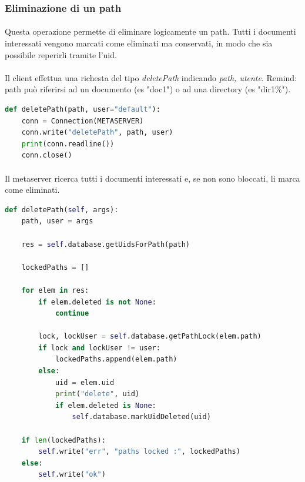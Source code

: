 \documentclass{article}
\begin{document}
\subsubsection{Eliminazione di un path}

\paragraph{} Questa operazione permette di eliminare logicamente un path. Tutti i documenti interessati vengono marcati come eliminati ma conservati, in modo che sia possibile reperirli tramite l'uid.

\paragraph{} Il client effettua una richesta del tipo \emph{deletePath} indicando \emph{path, utente}. Remind: path può riferirsi ad un documento (es "doc1") o ad una directory (es "dir1\%"). 

\begin{lstlisting}[language=Python, title=Client]
def deletePath(path, user="default"):
    conn = Connection(METASERVER)
    conn.write("deletePath", path, user)
    print(conn.readline())
    conn.close()
\end{lstlisting}

\paragraph{} Il metaserver ricerca tutti i documenti interessati e, se non sono bloccati, li marca come eliminati. 

\begin{lstlisting}[language=Python, title=Metaserver]
def deletePath(self, args):
    path, user = args

    res = self.database.getUidsForPath(path)

    lockedPaths = []

    for elem in res:
        if elem.deleted is not None:
            continue

        lock, lockUser = self.database.getPathLock(elem.path)
        if lock and lockUser != user:
            lockedPaths.append(elem.path)
        else:
            uid = elem.uid
            print("delete", uid)
            if elem.deleted is None:
                self.database.markUidDeleted(uid)

    if len(lockedPaths):
        self.write("err", "paths locked :", lockedPaths)
    else:
        self.write("ok")
\end{lstlisting}
\end{document}
